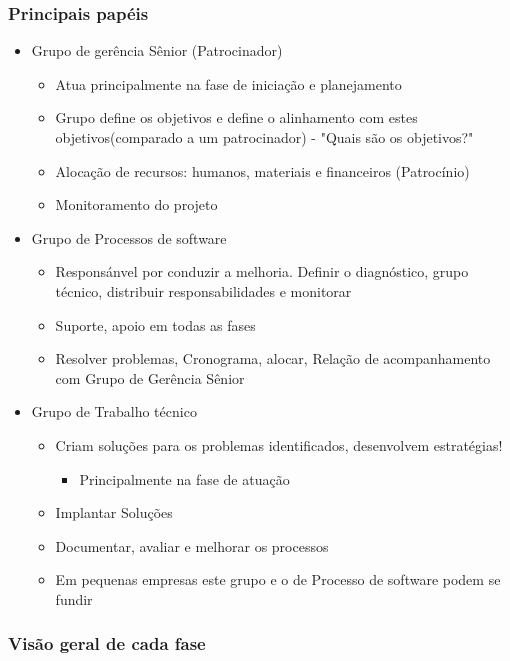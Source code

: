 \documentclass{article}
\begin{document}
\subsubsection{Principais papéis}
	\begin{itemize}
	\item Grupo de gerência Sênior (Patrocinador)	
		\begin{itemize}
		\item Atua principalmente na fase de iniciação e planejamento
		\item Grupo define os objetivos e define o alinhamento com estes objetivos(comparado a um patrocinador) - "Quais são os objetivos?"
		\item Alocação de recursos: humanos, materiais e financeiros (Patrocínio)
		\item Monitoramento do projeto		
		\end{itemize}				
		
	\item Grupo de Processos de software
		\begin{itemize}
		\item Responsánvel por conduzir a melhoria. Definir o diagnóstico, grupo técnico, distribuir responsabilidades e monitorar
		\item Suporte, apoio em todas as fases
		\item Resolver problemas, Cronograma, alocar, Relação de acompanhamento com Grupo de Gerência Sênior		
		\end{itemize}				
		
	\item Grupo de Trabalho técnico
		\begin{itemize}
		\item Criam soluções para os problemas identificados, desenvolvem estratégias!
			\begin{itemize}
			\item Principalmente na fase de atuação			
			\end{itemize}						
		\item Implantar Soluções	
		\item Documentar, avaliar e melhorar os processos		
		\item Em pequenas empresas este grupo e o de Processo de software podem se fundir
		\end{itemize}				
	
	\end{itemize}

	
\subsubsection{Visão geral de cada fase}
\end{document}
